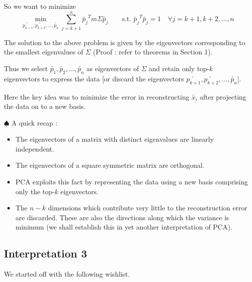 \documentclass[11pt, a4paper]{article}
\begin{document}
So we want to minimize
\[
\min_{\utilde{p_{k+1}}, \utilde{p_{k+2}}, \ldots, \utilde{p_n}} \sum_{j=k+1}^{n} \utilde{p_j}^T m \Sigma \utilde{p_j}
\qquad \text{s.t. } \utilde{p_j}^T \utilde{p_j} = 1 \quad \forall j = k+1, k+2, \ldots, n
\]

The solution to the above problem is given by the eigenvectors corresponding to the smallest eigenvalues of $\Sigma$ (Proof : refer to theorems in Section 1). \\

\vspace{0.3cm}

Thus we select $\utilde{p_1}, \utilde{p_2}, \ldots, \utilde{p_n}$ as eigenvectors of $\Sigma$ and retain only top-$k$ eigenvectors to express the data [or discard the eigenvectors $\utilde{p_{k+1}}, \utilde{p_{k+2}}, \ldots, \utilde{p_n}$]. \\

\vspace{0.3cm}

Here the key idea was to minimize the error in reconstructing $\utilde{x_i}$ after projecting the data on to a new basis. \\

\vspace{0.3cm}

$\spadesuit$ A quick recap :

\begin{itemize}
\item The eigenvectors of a matrix with distinct eigenvalues are linearly independent.
\item The eigenvectors of a square symmetric matrix are orthogonal.
\item PCA exploits this fact by representing the data using a new basis comprising only the top-$k$ eigenvectors.
\item The $n - k$ dimensions which contribute very little to the reconstruction error are discarded. These are also the directions along which the variance is minimum (we shall establish this in yet another interpretation of PCA).
\end{itemize}


\subsection{Interpretation 3}

We started off with the following wishlist. \\

\vspace{0.3cm}
\end{document}
